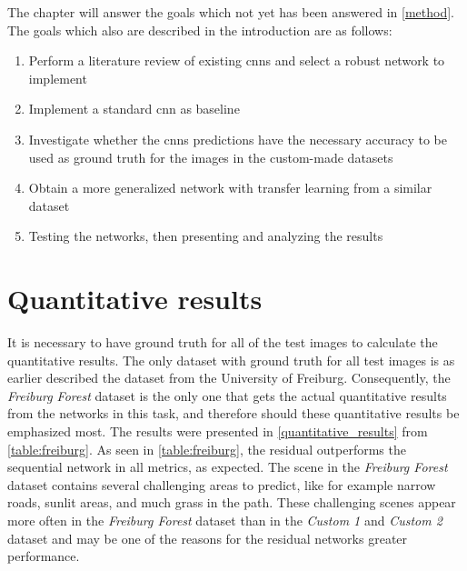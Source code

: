 \documentclass[USenglish]{ifimaster}  %
\begin{document}
The chapter will answer the goals which not yet has been answered in \vref{method}. The goals which also are described in the introduction are as follows: 
\begin{enumerate}
    \item Perform a literature review of existing \acp{cnn} and select a robust network to implement
    \item Implement a standard \ac{cnn} as baseline
    \item Investigate whether the \acp{cnn} predictions have the necessary accuracy to be used as ground truth for the images in the custom-made datasets
    \item Obtain a more generalized network with transfer learning from a similar dataset
    \item Testing the networks, then presenting and analyzing the results
\end{enumerate}

\section{Quantitative results}
It is necessary to have ground truth for all of the test images to calculate the quantitative results. The only dataset with ground truth for all test images is as earlier described the dataset from the University of Freiburg. Consequently, the \textit{Freiburg Forest} dataset is the only one that gets the actual quantitative results from the networks in this task, and therefore should these quantitative results be emphasized most. The results were presented in \vref{quantitative_results} from \vref{table:freiburg}. As seen in \vref{table:freiburg}, the residual outperforms the sequential network in all metrics, as expected. The scene in the \textit{Freiburg Forest} dataset contains several challenging areas to predict, like for example narrow roads, sunlit areas, and much grass in the path. These challenging scenes appear more often in the \textit{Freiburg Forest} dataset than in the \textit{Custom 1} and \textit{Custom 2} dataset and may be one of the reasons for the residual networks greater performance. 
\end{document}
